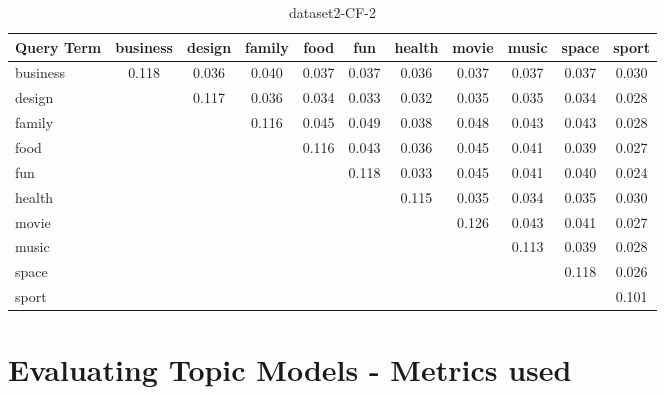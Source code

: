 \documentclass{sig-alternate}
\begin{document}
\begin{table}[!ht]
\centering
\resizebox{14cm}{!} 
{
	\begin{tabular}{|l|c|c|c|c|c|c|c|c|c|c|}
	\hline
	Query Term & business & design & family & food & fun & health & movie & music & space & sport\\
	\hline
business	 & 0.118 & 0.036 & 0.040 & 0.037 & 0.037 & 0.036 & 0.037 & 0.037 & 0.037 & 0.030\\ 
	 	\hline
design & 	 	& 0.117 & 0.036 & 0.034 & 0.033 & 0.032 & 0.035 & 0.035 & 0.034 & 0.028
	 	\\ 
	 	\hline
	 	
	 family &  & 	 & 0.116 & 0.045 & 0.049 & 0.038 & 0.048 & 0.043 & 0.043 & 0.028 
	 	 \\ 
	 	\hline
food &  &  & 	 	& 0.116 & 0.043 & 0.036 & 0.045 & 0.041 & 0.039 & 0.027 
	 	\\ 
	 	\hline
	fun  &  &  &  & 	& 0.118 & 0.033 & 0.045 & 0.041 & 0.040 & 0.024 
	 	\\ 
	 	\hline
	 health	 &  &  &  &  & & 0.115 & 0.035 & 0.034 & 0.035 & 0.030
	 	\\ 
	 	\hline
movie	 	 &  &  &  &  &  &  & 0.126 & 0.043 & 0.041 & 0.027 
	 	 \\ 
	 	\hline
music	 &  &  &  &  &  &  & & 0.113 & 0.039 & 0.028 
	 	\\ 
	 	\hline
	 space	 &  &  &  &  &  &  &  & & 0.118 & 0.026 
	 	\\ 
	 	\hline
sport	  &  &  &  &  &  &  &  & & 	& 0.101\\
	\hline
	\end{tabular}
}
\caption{dataset2-CF-2}\label{cf6}
\end{table}




 


\section{Evaluating Topic Models - Metrics used}

\label{sec:evaluation}
\end{document}
